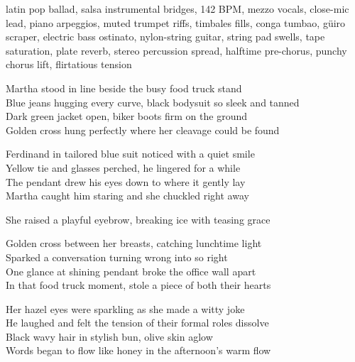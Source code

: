 

\begin{notes}
\end{notes}

\begin{style}
latin pop ballad, salsa instrumental bridges, 142 BPM, mezzo vocals, close-mic lead, piano arpeggios, muted trumpet riffs, timbales fills, conga tumbao, güiro scraper, electric bass ostinato, nylon-string guitar, string pad swells, tape saturation, plate reverb, stereo percussion spread, halftime pre-chorus, punchy chorus lift, flirtatious tension
\end{style}

\begin{lyrics}

Martha stood in line beside the busy food truck stand\\
Blue jeans hugging every curve, black bodysuit so sleek and tanned\\
Dark green jacket open, biker boots firm on the ground\\
Golden cross hung perfectly where her cleavage could be found

Ferdinand in tailored blue suit noticed with a quiet smile\\
Yellow tie and glasses perched, he lingered for a while\\
The pendant drew his eyes down to where it gently lay\\
Martha caught him staring and she chuckled right away

She raised a playful eyebrow, breaking ice with teasing grace

Golden cross between her breasts, catching lunchtime light\\
Sparked a conversation turning wrong into so right\\
One glance at shining pendant broke the office wall apart\\
In that food truck moment, stole a piece of both their hearts

Her hazel eyes were sparkling as she made a witty joke\\
He laughed and felt the tension of their formal roles dissolve\\
Black wavy hair in stylish bun, olive skin aglow\\
Words began to flow like honey in the afternoon’s warm flow


\end{lyrics}
